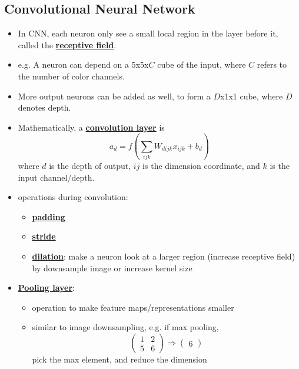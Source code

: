\documentclass[twocolumn,landscape,10pt]{article}
\theoremstyle{definition}
\begin{document}
\subsection{Convolutional Neural Network}

\begin{itemize}
    \item In CNN, each neuron only see a small local region in the layer before
        it, called the \underline{\textbf{receptive field}}.
    \item e.g. A neuron can depend on a 5x5x$C$ cube of the input, where $C$
        refers to the number of color channels.
    \item More output neurons can be added as well, to form a $D$x1x1 cube,
        where $D$ denotes depth.
    \item Mathematically, a \underline{\textbf{convolution layer}} is
        \[
            a_d=f\left(\sum_{ijk}W_{dijk}x_{ijk}+b_d\right)
        \]
        where $d$ is the depth of output, $ij$ is the dimension coordinate, and
        $k$ is the input channel/depth.
    \item operations during convolution:
        \begin{itemize}
            \item \underline{\textbf{padding}}
            \item \underline{\textbf{stride}}
            \item \underline{\textbf{dilation}}: make a neuron look at a larger
                region (increase receptive field) by downsample image or increase kernel size
        \end{itemize} 
    \item \underline{\textbf{Pooling layer}}:
        \begin{itemize}
            \item operation to make feature maps/representations smaller
            \item similar to image downsampling, e.g. if max pooling, 
                \[
                    \begin{pmatrix}
                        1 & 2 \\
                        5 & 6
                    \end{pmatrix} 
                    \Rightarrow
                    \begin{pmatrix}
                        6
                    \end{pmatrix} 
                \]
                pick the max element, and reduce the dimension

\end{itemize}
\end{itemize}
\end{document}
